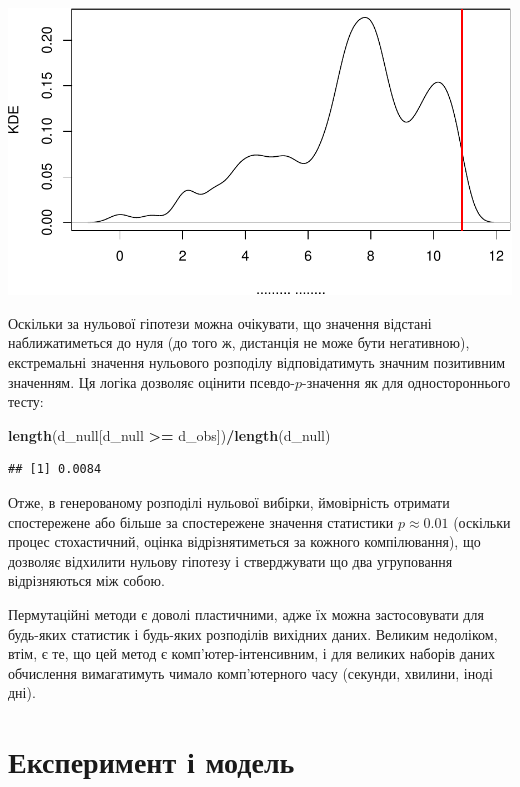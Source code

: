 \documentclass[
  11pt,
]{book}
\newenvironment{Shaded}{\begin{snugshade}}{\end{snugshade}}
\newcommand{\FunctionTok}[1]{\textcolor[rgb]{0.13,0.29,0.53}{\textbf{#1}}}
\newcommand{\NormalTok}[1]{#1}
\newcommand{\SpecialCharTok}[1]{\textcolor[rgb]{0.81,0.36,0.00}{\textbf{#1}}}
\begin{document}
\includegraphics{bookdown-demo_files/figure-latex/unnamed-chunk-15-1.pdf}

Оскільки за нульової гіпотези можна очікувати, що значення відстані наближатиметься до нуля (до того ж, дистанція не може бути негативною), екстремальні значення нульового розподілу відповідатимуть значним позитивним значенням. Ця логіка дозволяє оцінити псевдо-\(p\)-значення як для одностороннього тесту:

\begin{Shaded}
\begin{Highlighting}[]
\FunctionTok{length}\NormalTok{(d\_null[d\_null }\SpecialCharTok{\textgreater{}=}\NormalTok{ d\_obs])}\SpecialCharTok{/}\FunctionTok{length}\NormalTok{(d\_null)}
\end{Highlighting}
\end{Shaded}

\begin{verbatim}
## [1] 0.0084
\end{verbatim}

Отже, в генерованому розподілі нульової вибірки, ймовірність отримати спостережене або більше за спостережене значення статистики \(p \approx 0.01\) (оскільки процес стохастичний, оцінка відрізнятиметься за кожного компілювання), що дозволяє відхилити нульову гіпотезу і стверджувати що два угруповання відрізняються між собою.

Пермутаційні методи є доволі пластичними, адже їх можна застосовувати для будь-яких статистик і будь-яких розподілів вихідних даних. Великим недоліком, втім, є те, що цей метод є комп'ютер-інтенсивним, і для великих наборів даних обчислення вимагатимуть чимало комп'ютерного часу (секунди, хвилини, іноді дні).

\section{Експеримент і модель}\label{stat-models}
\end{document}
